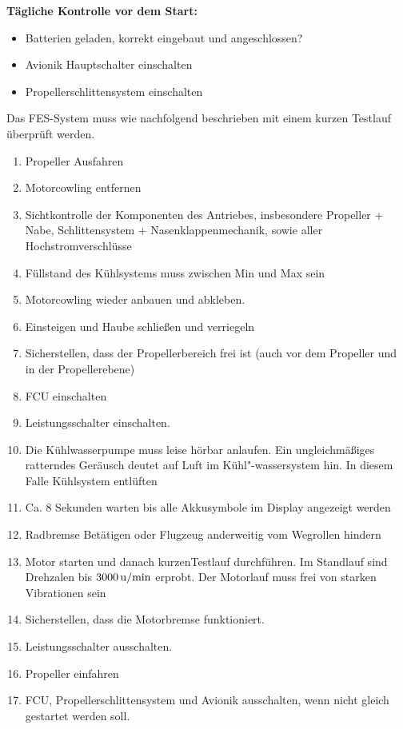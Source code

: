 \textbf{Tägliche Kontrolle vor dem Start: \\}
\begin{itemize}
\item Batterien geladen, korrekt eingebaut und angeschlossen?
\item Avionik Hauptschalter einschalten
\item Propellerschlittensystem einschalten
\end{itemize}

Das FES-System muss wie nachfolgend beschrieben mit einem kurzen Testlauf überprüft werden.\\

\begin{enumerate}

\item Propeller Ausfahren
\item	Motorcowling entfernen
\item	Sichtkontrolle der Komponenten des Antriebes, insbesondere Propeller + Nabe, Schlittensystem + Nasenklappenmechanik, sowie aller Hochstromverschlüsse
\item	 Füllstand des Kühlsystems muss zwischen Min und Max sein
\item	 Motorcowling wieder anbauen und abkleben.
\item	Einsteigen und Haube schließen und verriegeln
\item	 Sicherstellen, dass der Propellerbereich frei ist (auch vor dem Propeller und in der Propellerebene)
\item	FCU einschalten
\item	Leistungsschalter einschalten.
\item	Die Kühlwasserpumpe muss leise hörbar anlaufen. Ein ungleichmäßiges ratterndes Geräusch deutet auf Luft im Kühl"-wassersystem hin. In diesem Falle Kühlsystem entlüften
\item	Ca. 8 Sekunden warten bis alle Akkusymbole im Display angezeigt werden
\item	Radbremse Betätigen oder Flugzeug anderweitig vom Wegrollen hindern
\item	 Motor starten und danach kurzenTestlauf durchführen. Im Standlauf sind Drehzalen bis $\unit[3000]{u/min}$ erprobt. Der Motorlauf muss frei von starken Vibrationen sein


\item	Sicherstellen, dass die Motorbremse funktioniert.
\item	Leistungsschalter ausschalten.
\item	Propeller einfahren
\item	FCU, Propellerschlittensystem und Avionik ausschalten, wenn nicht gleich gestartet werden soll.
\end{enumerate}


